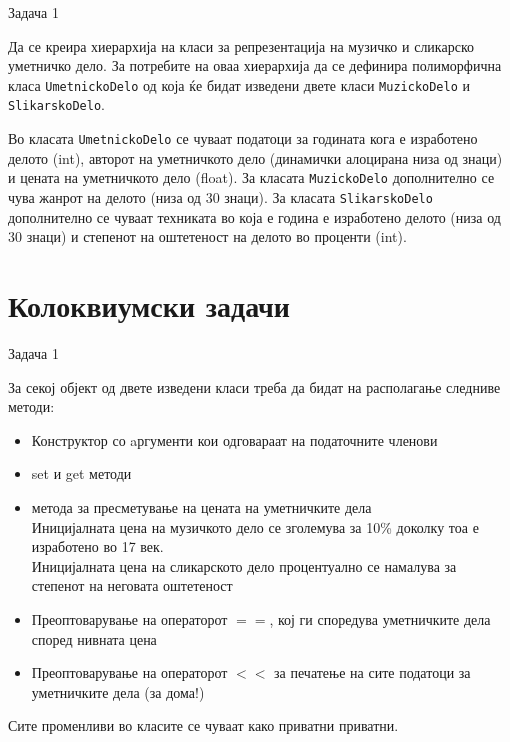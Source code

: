 \begin{frame}{Задача 1}
\begin{scriptsize}
Да се креира хиерархија на класи за репрезентација на музичко и сликарско
уметничко дело. За потребите на оваа хиерархија да се дефинира полиморфична
класа \texttt{UmetnickoDelo} од која ќе бидат изведени двете класи
\texttt{MuzickoDelo} и \texttt{SlikarskoDelo}. 

Во класата \texttt{UmetnickoDelo} се чуваат податоци за годината кога е
изработено делото (int), авторот на уметничкото дело (динамички алоцирана низа
од знаци) и цената на уметничкото дело (float). За класата \texttt{MuzickoDelo}
дополнително се чува жанрот на делото (низа од 30 знаци). За класата
\texttt{SlikarskoDelo} дополнително се чуваат техниката во која е година е
изработено делото (низа од 30 знаци) и степенот на оштетеност на делото во
проценти (int).
\end{scriptsize}
\end{frame}

\section{Колоквиумски задачи}

\begin{frame}{Задача 1}
\begin{scriptsize}
За секој објект од двете изведени класи треба да бидат на располагање следниве
методи: 
\begin{itemize}
  \item Конструктор со aргументи кои одговараат на податочните членови
  \item set и get методи
  \item метода за пресметување на цената на уметничките дела \\
  Иницијалната цена на музичкото дело се зголемува за 10\% доколку тоа е
  изработено во 17 век.\\
  Иницијалната цена на сликарското дело процентуално се
намалува за степенот на неговата оштетеност
\item Преоптоварување на операторот $==$, кој ги споредува уметничките дела
според нивната цена
\item Преоптоварување на операторот $<<$ за печатење на сите податоци
за уметничките дела (за дома!) 
\end{itemize}
Сите променливи во класите се чуваат како приватни приватни.

\end{scriptsize}
\end{frame}


